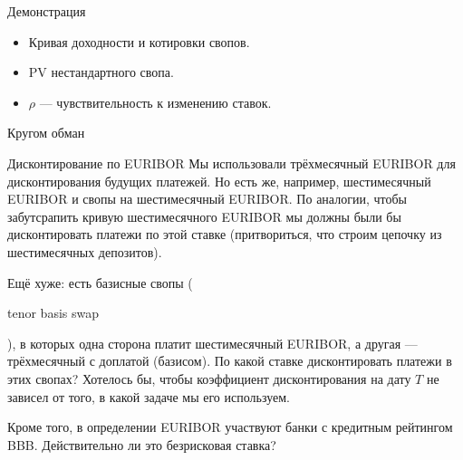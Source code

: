 \documentclass{beamer}
\newcommand{\en}[1]{\begin{otherlanguage}{english}#1\end{otherlanguage}}
\begin{document}
\begin{frame}{Демонстрация}
\justify
\begin{itemize}
\item Кривая доходности и котировки свопов.
\item PV нестандартного свопа.
\item $\rho$ --- чувствительность к изменению ставок. 
\end{itemize}
\end{frame}



\begin{frame}{Кругом обман}
\centering
{}
\end{frame}



\begin{frame}{Дисконтирование по EURIBOR}
\justify
Мы использовали трёхмесячный EURIBOR для дисконтирования будущих платежей. Но есть же, например, шестимесячный EURIBOR и свопы на шестимесячный EURIBOR. По аналогии, чтобы забутсрапить кривую шестимесячного EURIBOR мы должны были бы дисконтировать платежи по этой ставке (притвориться, что строим цепочку из шестимесячных депозитов).

\justify
Ещё хуже: есть базисные свопы (\en{tenor basis swap}), в которых одна сторона платит шестимесячный EURIBOR, а другая --- трёхмесячный с доплатой (базисом). По какой ставке  дисконтировать платежи в этих свопах? Хотелось бы, чтобы коэффициент дисконтирования на дату $T$ не зависел от того, в какой задаче мы его используем.

\justify
Кроме того, в определении EURIBOR участвуют банки с кредитным рейтингом BBB. Действительно ли это безрисковая ставка?
\end{frame}
\end{document}
